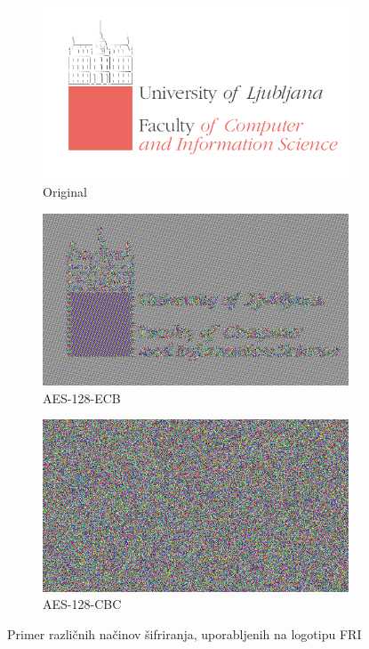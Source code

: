 \documentclass[12pt,a4paper,openany,tikz]{book}
\theoremstyle{plain}
\theoremstyle{definition}
\begin{document}
\begin{figure}[ht!]
  \centering
  \begin{subfigure}[b]{0.3\textwidth}
    \includegraphics[width=\textwidth]{images/LogoFRI}
    \caption{Original}
\label{fig:logoFRIorig}
  \end{subfigure}
  \begin{subfigure}[b]{0.3\textwidth}
    \includegraphics[width=\textwidth]{images/LogoFRI_ecb}
    \caption{AES-128-ECB}
\label{fig:logoFRIECB}
  \end{subfigure}
  \begin{subfigure}[b]{0.3\textwidth}
    \includegraphics[width=\textwidth]{images/LogoFRI_cbc}
    \caption{AES-128-CBC}
\label{fig:logoFRICBC}
  \end{subfigure}
  \caption{Primer različnih načinov šifriranja, uporabljenih na logotipu FRI}
\label{fig:ecbbad}
\end{figure}
\end{document}
